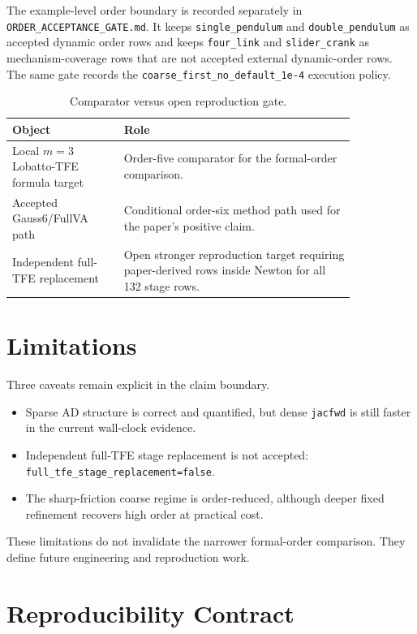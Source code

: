 \documentclass[11pt]{article}
\newcommand{\method}{Gauss6\slash FullVA}
\newcommand{\tfe}{TFE}
\newcommand{\artifact}[1]{\nolinkurl{#1}}
\begin{document}
The example-level order boundary is recorded separately in
\artifact{ORDER_ACCEPTANCE_GATE.md}.  It keeps \artifact{single_pendulum} and
\artifact{double_pendulum} as accepted dynamic order rows and keeps
\artifact{four_link} and \artifact{slider_crank} as mechanism-coverage rows
that are not accepted external dynamic-order rows.  The same gate records the
\artifact{coarse_first_no_default_1e-4} execution policy.

\begin{table}[htbp]
\centering
\caption{Comparator versus open reproduction gate.}
\label{tab:comparator}
\begin{tabular}{P{0.27\linewidth}P{0.57\linewidth}}
\toprule
Object & Role \\
\midrule
Local $m=3$ Lobatto-\tfe{} formula target &
Order-five comparator for the formal-order comparison. \\
Accepted \method{} path &
Conditional order-six method path used for the paper's positive claim. \\
Independent full-\tfe{} replacement &
Open stronger reproduction target requiring paper-derived rows inside Newton
for all 132 stage rows. \\
\bottomrule
\end{tabular}
\end{table}

\section{Limitations}

Three caveats remain explicit in the claim boundary.
\begin{itemize}
  \item Sparse AD structure is correct and quantified, but dense
  \artifact{jacfwd} is still faster in the current wall-clock evidence.
  \item Independent full-\tfe{} stage replacement is not accepted:
  \nolinkurl{full_tfe_stage_replacement=false}.
  \item The sharp-friction coarse regime is order-reduced, although deeper
  fixed refinement recovers high order at practical cost.
\end{itemize}
These limitations do not invalidate the narrower formal-order comparison.
They define future engineering and reproduction work.

\section{Reproducibility Contract}
\end{document}
